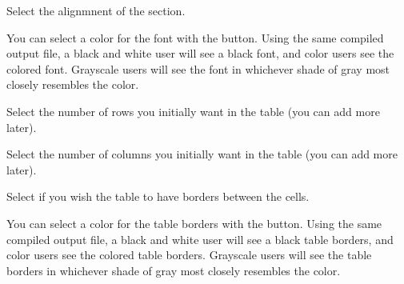 
 Select the alignmnent of the section.



 You can select a color for the font
with the  button. Using the same compiled 
output file, a black and white user will see a black font, and
color users see the colored font. Grayscale users will see the 
font in whichever shade of gray most closely resembles the color. 


 Select the number of rows you initially want in
the table (you can add more later).

 Select the number of columns you initially
want in the table (you can add more later).

 Select if you wish the table to have borders
between the cells.

 You can select a color for the table borders
with the  button. Using the same compiled
output file, a black and white user will see a black table borders, and
color users see the colored table borders. Grayscale users will see the
table borders in whichever shade of gray most closely resembles the color.

